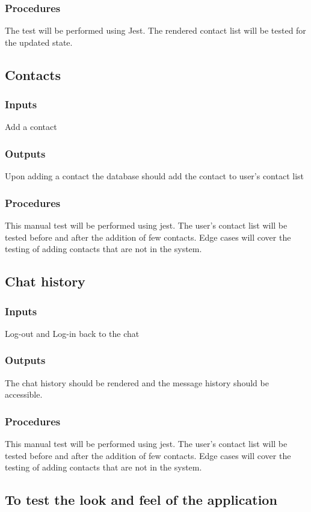 \documentclass[12pt, titlepage]{article}
\begin{document}
\subsubsection{Procedures}
The test will  be performed using Jest. The rendered contact list will be tested for the updated state.
\subsection{Contacts}
\subsubsection{Inputs}
Add a contact
\subsubsection{Outputs}
Upon adding a contact the database should add the contact to user's contact list
\subsubsection{Procedures}
This manual test will be performed using jest. The user's contact list will be tested before and after the addition of few contacts. Edge cases will cover the testing of adding contacts that are not in the system.
\subsection{Chat history}
\subsubsection{Inputs}
Log-out and Log-in back to the chat
\subsubsection{Outputs}
The chat history should be rendered and the message history should be accessible.
\subsubsection{Procedures}
This manual test will be performed using jest. The user's contact list will be tested before and after the addition of few contacts. Edge cases will cover the testing of adding contacts that are not in the system.
\subsection{To test the look and feel of the application}
\end{document}
